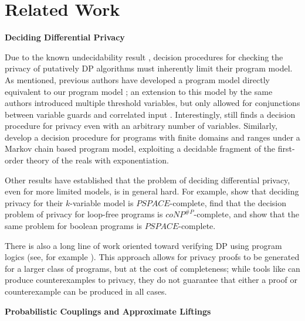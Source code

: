 \section{Related Work}

\textbf{Deciding Differential Privacy}

Due to the known undecidability result \cite{bartheDecidingDifferentialPrivacy2020}, decision procedures for checking the privacy of putatively DP algorithms must inherently limit their program model. As mentioned, previous authors have developed a program model directly equivalent to our program model \cite{chadhaLinearTimeDecidability2021}; 
an extension to this model by the same authors introduced multiple threshold variables, but only allowed for conjunctions between variable guards and correlated input \cite{chadhaDecidingDifferentialPrivacy2023}. Interestingly, \cite{chadhaDecidingDifferentialPrivacy2023} still finds a decision procedure for privacy even with an arbitrary number of variables. 
Similarly, \cite{bartheDecidingDifferentialPrivacy2020} develop a decision procedure for programs with finite domains and ranges under a Markov chain based program model, exploiting a decidable fragment of the first-order theory of the reals with exponentiation. 

Other results have established that the problem of deciding differential privacy, even for more limited models, is in general hard. For example, \cite{chadhaDecidingDifferentialPrivacy2023} show that deciding privacy for their $k$-variable model is $PSPACE$-complete, \cite{gaboardiComplexityVerifyingLoopFree2020} find that the decision problem of privacy for loop-free programs is $coNP^{\#P}$-complete,
and \cite{bunComplexityVerifyingBoolean2022} show that the same problem for boolean programs is $PSPACE$-complete. 

There is also a long line of work oriented toward verifying DP using program logics (see, for example \cite{reedDistanceMakesTypes2010,wangCheckDPAutomatedIntegrated2020,wangProvingDifferentialPrivacy2019,zhangTestingDifferentialPrivacy2020,zhangLightDPAutomatingDifferential2017}). 
This approach allows for privacy proofs to be generated for a larger class of programs, but at the cost of completeness; while tools like \cite{wangCheckDPAutomatedIntegrated2020} can produce counterexamples to privacy, they do not guarantee that either a proof or counterexample can be produced in all cases.

\textbf{Probabilistic Couplings and Approximate Liftings}

